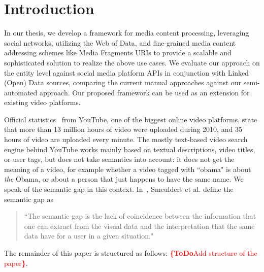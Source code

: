 \documentclass[runningheads,a4paper]{llncs}
\newcommand{\todo}[1]{\noindent\textcolor{red}{{\bf \{ToDo}#1{\bf \}}}}
\begin{document}
\section{Introduction}
In our thesis, we develop a framework for media content processing, leveraging social networks, utilizing the Web of Data, and fine-grained media content addressing schemes like Media Fragments URIs to provide a scalable and sophisticated solution to realize the above use cases. We evaluate our approach on the entity level against social media platform APIs in conjunction with Linked (Open) Data sources, comparing the current manual approaches against our semi-automated approach. Our proposed framework can be used as an extension for existing video platforms.

Official statistics~\cite{youtube:stats} from YouTube, one of the biggest online video platforms, state that more than 13 million hours of video were uploaded during 2010, and 35 hours of video are uploaded every minute. The mostly text-based video search engine behind YouTube works mainly based on textual descriptions, video titles, or user tags, but does not take semantics into account: it does not get the meaning of a video, for example whether a video tagged with ``obama" is about \textit{the} Obama, or about a person that just happens to have the same name. We speak of the semantic gap in this context. In~\cite{Smeulders}, Smeulders et al. define the semantic gap as
\begin{quotation}
\noindent ``The semantic gap is the lack of coincidence between the information that one can extract from the visual data and the interpretation that the same data have for a user in a given situation."
\end{quotation}

The remainder of this paper is structured as follows: \todo{Add structure of the paper}.
\end{document}
